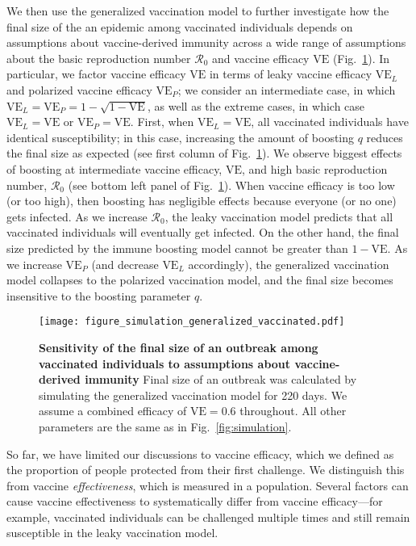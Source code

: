 \documentclass[12pt]{article}
\newcommand{\fref}[1]{Fig.~\ref{fig:#1}}
\newcommand{\VE}{\ensuremath{\textrm{VE}}}
\begin{document}
We then use the generalized vaccination model to further investigate how the final size of the an epidemic among vaccinated individuals depends on assumptions about vaccine-derived immunity across a wide range of assumptions about the basic reproduction number $\mathcal R_0$ and vaccine efficacy $\VE$ (\fref{sensitivity}).
In particular, we factor vaccine efficacy $\VE$ in terms of leaky vaccine efficacy $\VE_L$ and polarized vaccine efficacy $\VE_P$; we consider an intermediate case, in which $\VE_L = \VE_P = 1 - \sqrt{1-\VE}$, as well as the extreme cases, in which case $\VE_L = \VE$ or $\VE_P = \VE$.
First, when $\VE_L = \VE$, all vaccinated individuals have identical susceptibility;
in this case, increasing the amount of boosting $q$ reduces the final size as expected (see first column of \fref{sensitivity}).
We observe biggest effects of boosting at intermediate vaccine efficacy, $\VE$, and high basic reproduction number, $\mathcal R_0$ (see bottom left panel of \fref{sensitivity}).
When vaccine efficacy is too low (or too high), then boosting has negligible effects because everyone (or no one) gets infected.
As we increase $\mathcal R_0$, the leaky vaccination model predicts that all vaccinated individuals will eventually get infected.
On the other hand, the final size predicted by the immune boosting model cannot be greater than $1-\VE$.
As we increase $\VE_P$ (and decrease $\VE_L$ accordingly), the generalized vaccination model collapses to the polarized vaccination model, and the final size becomes insensitive to the boosting parameter $q$.

\begin{figure}[!th]
\texttt{[image: figure\_simulation\_generalized\_vaccinated.pdf]}
\caption{
\textbf{Sensitivity of the final size of an outbreak among vaccinated individuals to assumptions about vaccine-derived immunity}
Final size of an outbreak was calculated by simulating the generalized vaccination model for 220 days. 
We assume a combined efficacy of $\VE = 0.6$ throughout.
All other parameters are the same as in \fref{simulation}.
\label{fig:sensitivity}
}
\end{figure}

So far, we have limited our discussions to vaccine efficacy, which we defined as the proportion of people protected from their first challenge. 
We distinguish this from vaccine \textit{effectiveness}, which is measured in a population.
Several factors can cause vaccine effectiveness to systematically differ from vaccine efficacy---for example, vaccinated individuals can be challenged multiple times and still remain susceptible in the leaky vaccination model.
\end{document}
